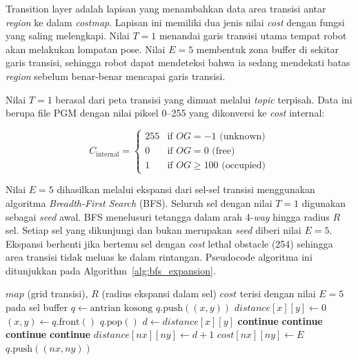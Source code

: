 Transition layer adalah lapisan yang menambahkan data area transisi
antar \emph{region} ke dalam \emph{costmap}. Lapisan ini memiliki dua
jenis nilai \emph{cost} dengan fungsi yang saling melengkapi. Nilai $T = 1$
menandai garis transisi utama tempat robot akan melakukan lompatan
pose. Nilai $E = 5$ membentuk zona buffer di sekitar garis transisi,
sehingga robot dapat mendeteksi bahwa ia sedang mendekati batas
\emph{region} sebelum benar-benar mencapai garis transisi. 

Nilai $T = 1$ berasal dari peta transisi yang dimuat melalui
\emph{topic} terpisah. Data ini berupa file PGM dengan nilai piksel
0--255 yang dikonversi ke \emph{cost} internal:

\begin{equation}
C_{\text{internal}} = \begin{cases}
255 & \text{if } OG = -1 \text{ (unknown)} \\
0   & \text{if } OG = 0 \text{ (free)} \\
1   & \text{if } OG \geq 100 \text{ (occupied)}
\end{cases}
\end{equation}

Nilai $E = 5$ dihasilkan melalui ekspansi dari sel-sel transisi
menggunakan algoritma \emph{Breadth-First Search} (BFS). Seluruh sel
dengan nilai $T = 1$ digunakan sebagai \emph{seed} awal. BFS
menelusuri tetangga dalam arah 4-\emph{way} hingga radius $R$ sel.
Setiap sel yang dikunjungi dan bukan merupakan \emph{seed} diberi
nilai $E = 5$. Ekspansi berhenti jika bertemu sel dengan \emph{cost}
lethal obstacle (254) sehingga area transisi tidak meluas ke dalam
rintangan. Pseudocode algoritma ini ditunjukkan pada
Algorithm~\ref{alg:bfs_expansion}.

\begin{algorithm}[H]
\caption{BFS Expansion untuk Transition Layer}
\label{alg:bfs_expansion}
\begin{algorithmic}[1]
\Require $map$ (grid transisi), $R$ (radius ekspansi dalam sel)
\Ensure $cost$ terisi dengan nilai $E = 5$ pada sel buffer
\State $q \gets \text{antrian kosong}$
    \State $q.\text{push}((x, y))$
    \State $distance[x][y] \gets 0$
\EndFor
{}
    \State $(x, y) \gets q.\text{front}()$
    \State $q.\text{pop}()$
    \State $d \gets distance[x][y]$
        \State \textbf{continue}
    \EndIf
            \State \textbf{continue}
        \EndIf
            \State \textbf{continue}
        \EndIf
            \State \textbf{continue}
        \EndIf
        \State $distance[nx][ny] \gets d + 1$
            \State $cost[nx][ny] \gets E$
        \EndIf
        \State $q.\text{push}((nx, ny))$
    \EndFor
\EndWhile
\end{algorithmic}
\end{algorithm}

